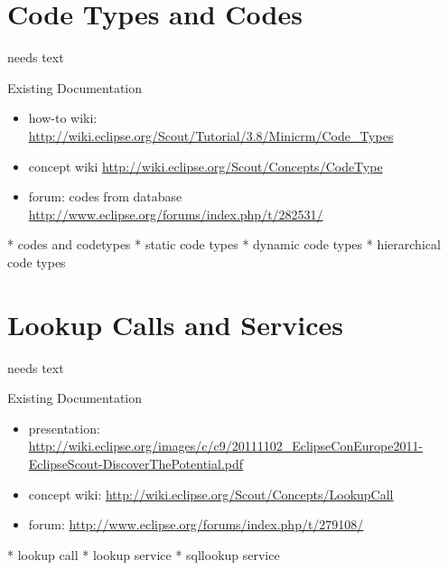 \documentclass[a4paper,10pt,twoside]{book}
\begin{document}
\section{Code Types and Codes}
needs text

\noindent Existing Documentation
\begin{itemize}
  \item how-to wiki: \url{http://wiki.eclipse.org/Scout/Tutorial/3.8/Minicrm/Code_Types}
  \item concept wiki \url{http://wiki.eclipse.org/Scout/Concepts/CodeType}
  \item forum: codes from database \url{http://www.eclipse.org/forums/index.php/t/282531/}
\end{itemize}

  * codes and codetypes
  * static code types
  * dynamic code types
  * hierarchical code types

\section{Lookup Calls and Services}
needs text
 
\noindent Existing Documentation
\begin{itemize}
  \item presentation: \url{http://wiki.eclipse.org/images/c/c9/20111102_EclipseConEurope2011-EclipseScout-DiscoverThePotential.pdf}
  \item concept wiki: \url{http://wiki.eclipse.org/Scout/Concepts/LookupCall}
  \item forum: \url{http://www.eclipse.org/forums/index.php/t/279108/}
\end{itemize}

  * lookup call
  * lookup service
  * sqllookup service
\end{document}
